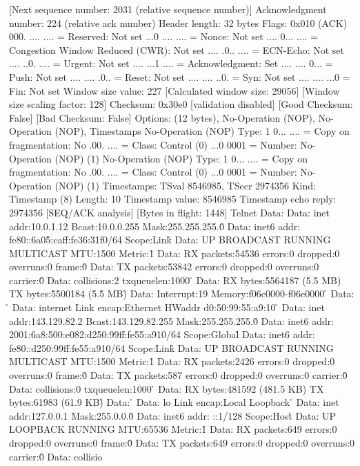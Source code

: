     [Next sequence number: 2031    (relative sequence number)]
    Acknowledgment number: 224    (relative ack number)
    Header length: 32 bytes
    Flags: 0x010 (ACK)
        000. .... .... = Reserved: Not set
        ...0 .... .... = Nonce: Not set
        .... 0... .... = Congestion Window Reduced (CWR): Not set
        .... .0.. .... = ECN-Echo: Not set
        .... ..0. .... = Urgent: Not set
        .... ...1 .... = Acknowledgment: Set
        .... .... 0... = Push: Not set
        .... .... .0.. = Reset: Not set
        .... .... ..0. = Syn: Not set
        .... .... ...0 = Fin: Not set
    Window size value: 227
    [Calculated window size: 29056]
    [Window size scaling factor: 128]
    Checksum: 0x30e0 [validation disabled]
        [Good Checksum: False]
        [Bad Checksum: False]
    Options: (12 bytes), No-Operation (NOP), No-Operation (NOP), Timestamps
        No-Operation (NOP)
            Type: 1
                0... .... = Copy on fragmentation: No
                .00. .... = Class: Control (0)
                ...0 0001 = Number: No-Operation (NOP) (1)
        No-Operation (NOP)
            Type: 1
                0... .... = Copy on fragmentation: No
                .00. .... = Class: Control (0)
                ...0 0001 = Number: No-Operation (NOP) (1)
        Timestamps: TSval 8546985, TSecr 2974356
            Kind: Timestamp (8)
            Length: 10
            Timestamp value: 8546985
            Timestamp echo reply: 2974356
    [SEQ/ACK analysis]
        [Bytes in flight: 1448]
Telnet
    Data: 
    Data:           inet addr:10.0.1.12  Bcast:10.0.0.255  Mask:255.255.255.0\r\n
    Data:           inet6 addr: fe80::6a05:caff:fe36:31f0/64 Scope:Link\r\n
    Data:           UP BROADCAST RUNNING MULTICAST  MTU:1500  Metric:1\r\n
    Data:           RX packets:54536 errors:0 dropped:0 overruns:0 frame:0\r\n
    Data:           TX packets:53842 errors:0 dropped:0 overruns:0 carrier:0\r\n
    Data:           collisions:2 txqueuelen:1000 \r\n
    Data:           RX bytes:5564187 (5.5 MB)  TX bytes:5500184 (5.5 MB)\r\n
    Data:           Interrupt:19 Memory:f06c0000-f06e0000 \r\n
    Data: \r\n
    Data: internet  Link encap:Ethernet  HWaddr d0:50:99:55:a9:10  \r\n
    Data:           inet addr:143.129.82.2  Bcast:143.129.82.255  Mask:255.255.255.0\r\n
    Data:           inet6 addr: 2001:6a8:500:e082:d250:99ff:fe55:a910/64 Scope:Global\r\n
    Data:           inet6 addr: fe80::d250:99ff:fe55:a910/64 Scope:Link\r\n
    Data:           UP BROADCAST RUNNING MULTICAST  MTU:1500  Metric:1\r\n
    Data:           RX packets:2426 errors:0 dropped:0 overruns:0 frame:0\r\n
    Data:           TX packets:587 errors:0 dropped:0 overruns:0 carrier:0\r\n
    Data:           collisions:0 txqueuelen:1000 \r\n
    Data:           RX bytes:481592 (481.5 KB)  TX bytes:61983 (61.9 KB)\r\n
    Data: \r\n
    Data: lo        Link encap:Local Loopback  \r\n
    Data:           inet addr:127.0.0.1  Mask:255.0.0.0\r\n
    Data:           inet6 addr: ::1/128 Scope:Host\r\n
    Data:           UP LOOPBACK RUNNING  MTU:65536  Metric:1\r\n
    Data:           RX packets:649 errors:0 dropped:0 overruns:0 frame:0\r\n
    Data:           TX packets:649 errors:0 dropped:0 overruns:0 carrier:0\r\n
    Data:           collisio

